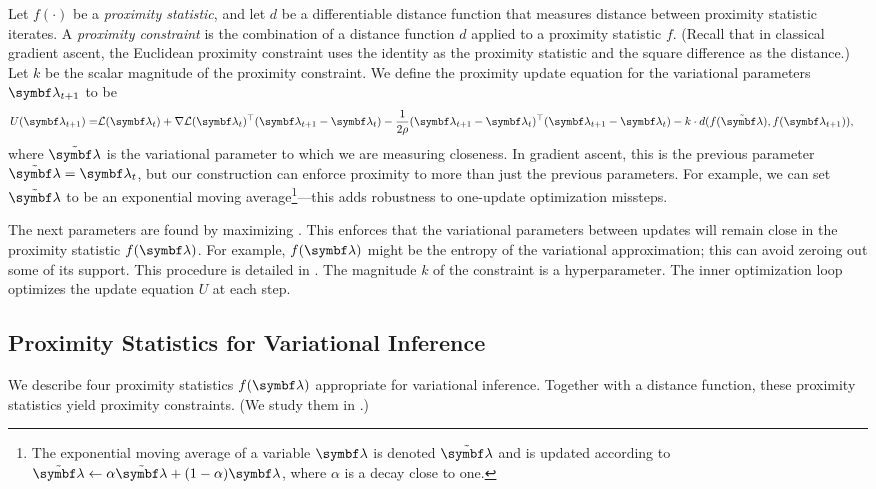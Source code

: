 Let $f(\cdot)$ be a \emph{proximity statistic}, and let $d$ be a differentiable
distance function that measures distance between proximity statistic iterates. A \emph{proximity constraint} is the combination of a distance function $d$ applied to a proximity statistic $f$. (Recall that in classical gradient ascent, the Euclidean proximity constraint uses the identity as the proximity statistic and the square difference as the distance.) Let $k$ be the scalar magnitude of the proximity constraint. We define the proximity update equation for the variational parameters $\mblambda_{t+1}$ to be
\begin{align}
  \begin{split}
    U(\mblambda_{t+1}) = &\cL(\mblambda_t)
    + \nabla \cL(\mblambda_t)^\top (\mblambda_{t+1}-\mblambda_t)
    -
    \frac{1}{2\rho}
    (\mblambda_{t+1}-\mblambda_t)^\top (\mblambda_{t+1}-\mblambda_t) %
    - k \cdot d(f(\tmblambda), f(\mblambda_{t+1})),
  \end{split}
  \label{eq:f-constrained}
\end{align}
where $\tmblambda$ is the variational parameter to which we are measuring closeness. In gradient ascent, this is the previous parameter $\tmblambda = \mblambda_t$, but our construction can enforce proximity to more than just the previous parameters. For example, we can set $\tmblambda$ to be an exponential moving average\footnote{The exponential moving average of a variable $\mblambda$ is denoted $\tmblambda$ and is updated according to $\tmblambda \leftarrow \alpha\tmblambda + (1-\alpha)\mblambda$, where $\alpha$ is a decay close to one.}---this adds robustness to one-update optimization missteps.

The next parameters are found by maximizing .  This enforces that the variational parameters between updates will remain close in the proximity statistic $f(\mblambda)$.  For example, $f(\mblambda)$ might be the entropy of the variational approximation; this can avoid zeroing out some of its support.  This procedure is detailed in . The magnitude $k$ of the constraint is a hyperparameter. The inner optimization loop optimizes the update equation $U$ at each step.


\subsection{Proximity Statistics for Variational Inference}
\label{sec:proximity_examples}
We describe four proximity statistics $f(\mblambda)$ appropriate for variational inference.  Together with a distance function, these proximity statistics yield proximity constraints. (We study them in .)

